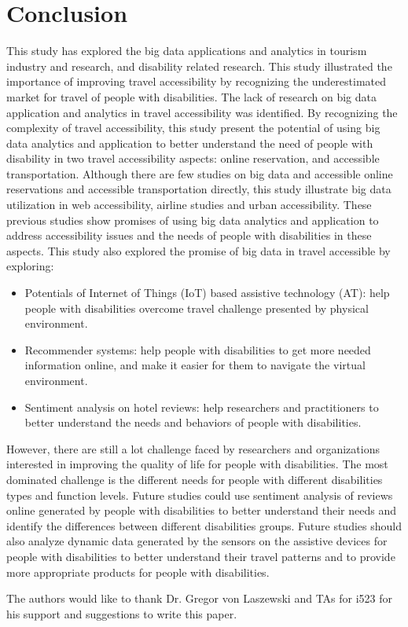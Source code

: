 \section{Conclusion}

This study has explored the big data applications and analytics  in tourism industry and 
research, and disability related research. This study illustrated the importance of 
improving travel accessibility by recognizing the underestimated market for travel of
people with disabilities. The lack of research on big data application and analytics 
in travel accessibility was identified. By recognizing the complexity of travel 
accessibility, this study present the potential of using big data analytics and 
application to better understand the need of people with disability 
in two travel accessibility aspects: online reservation, and accessible 
transportation. Although there are few studies on big data and accessible 
online reservations and accessible transportation directly, this study 
illustrate big data utilization in web accessibility, airline studies and urban 
accessibility. These previous studies show promises of using big data analytics 
and application to address accessibility issues and the needs of people with 
disabilities in these aspects. This study also explored the promise of big 
data in travel accessible by exploring:

\begin{itemize}
  \item Potentials of Internet of Things (IoT) based assistive technology (AT): help people with disabilities overcome travel challenge presented by physical environment.
  \item Recommender systems: help people with disabilities to get more needed information online, and make it easier for them to navigate the virtual environment.
  \item Sentiment analysis on hotel reviews: help researchers and practitioners to better understand the needs and behaviors of people with disabilities. 
\end{itemize}

However, there are still a lot challenge faced by researchers and organizations interested in
improving the quality of life for people with disabilities. The most dominated challenge is
the different needs for people with different disabilities types and function levels. Future
studies could use sentiment analysis of reviews online generated by people with disabilities 
to better understand their needs and identify the differences between different disabilities
groups. Future studies should also analyze dynamic data generated by the sensors on the 
assistive devices for people with disabilities to better understand their travel patterns
and to provide more appropriate products for people with disabilities. 

\begin{acks}

  The authors would like to thank Dr. Gregor von Laszewski and TAs for i523 for his
  support and suggestions to write this paper.

\end{acks}


 

\appendix
